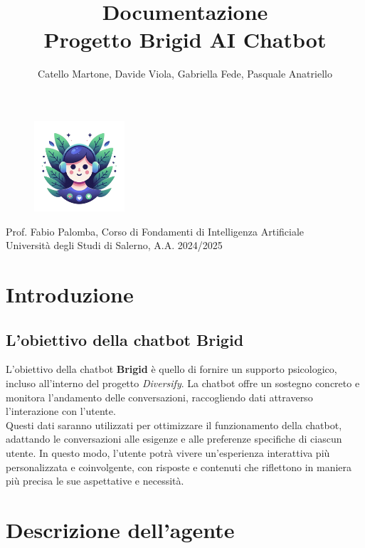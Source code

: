 \documentclass[12pt, letterpaper]{article}
\title{\Huge \textbf{Documentazione}\\[0.5cm]
\Large \textbf{Progetto Brigid AI Chatbot}}
\author{\large Catello Martone, Davide Viola, Gabriella Fede, Pasquale Anatriello}
\begin{document}
	
\begin{figure}[t]
\centering
\includegraphics[width=0.3\textwidth]{brigid.png}
\end{figure}
	
\maketitle
\vfill
\begin{center}
Prof. Fabio Palomba, Corso di Fondamenti di Intelligenza Artificiale\\
Università degli Studi di Salerno, A.A. 2024/2025
\end{center}
	
\newpage
\tableofcontents
\newpage
	
\section{Introduzione}
	
\subsection{L'obiettivo della chatbot Brigid}
L'obiettivo della chatbot \textbf{Brigid} è quello di fornire un supporto psicologico, incluso all'interno del progetto \textit{Diversify}. La chatbot offre un sostegno concreto e monitora l'andamento delle conversazioni, raccogliendo dati attraverso l'interazione con l'utente.\\ 
Questi dati saranno utilizzati per ottimizzare il funzionamento della chatbot, adattando le conversazioni alle esigenze e alle preferenze specifiche di ciascun utente. In questo modo, l'utente potrà vivere un'esperienza interattiva più personalizzata e coinvolgente, con risposte e contenuti che riflettono in maniera più precisa le sue aspettative e necessità.
	
\section{Descrizione dell'agente}
	
\end{document}
